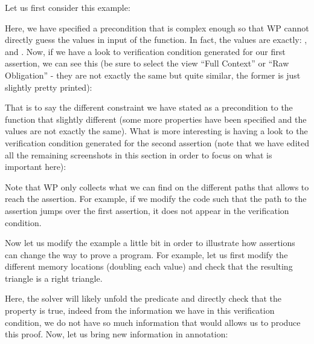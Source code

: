 Let us first consider this example:






Here, we have specified a precondition that is complex enough so that WP cannot
directly guess the values in input of the function. In fact, the values are
exactly: ,  and .
Now, if we have a look to verification condition generated for our first
assertion, we can see this (be sure to select the view ``Full Context'' or
``Raw Obligation'' - they are not exactly the same but quite similar, the former
is just slightly pretty printed):




That is to say the different constraint we have stated as a precondition to the
function that slightly different (some more properties have been specified and
the values are not exactly the same). What is more interesting is having a look
to the verification condition generated for the second assertion (note that we
have edited all the remaining screenshots in this section in order to focus on
what is important here):





Note that WP only collects what we can find on the different paths that allows
to reach the assertion. For example, if we modify the code such that the path
to the assertion jumps over the first assertion, it does not appear in the
verification condition.







Now let us modify the example a little bit in order to illustrate how assertions
can change the way to prove a program. For example, let us first modify the
different memory locations (doubling each value) and check that the resulting
triangle is a right triangle.








Here, the solver will likely unfold the predicate and directly check that the
property is true, indeed from the information we have in this verification
condition, we do not have so much information that would allows us to produce
this proof. Now, let us bring new information in annotation:



